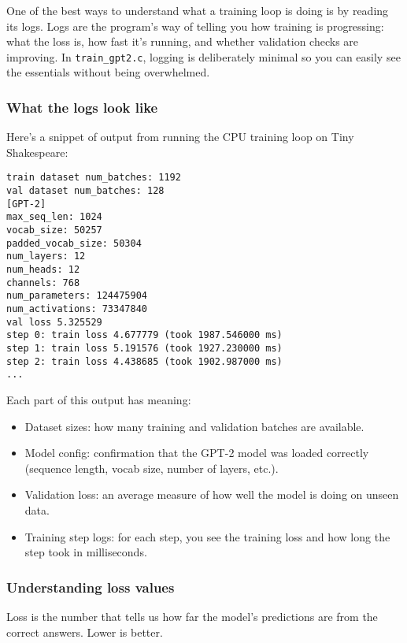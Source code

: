 \documentclass[
  letterpaper,
  DIV=11,
  numbers=noendperiod]{scrreprt}
\providecommand{\tightlist}{%
  \setlength{\itemsep}{0pt}\setlength{\parskip}{0pt}}
\begin{document}
One of the best ways to understand what a training loop is doing is by
reading its logs. Logs are the program's way of telling you how training
is progressing: what the loss is, how fast it's running, and whether
validation checks are improving. In \texttt{train\_gpt2.c}, logging is
deliberately minimal so you can easily see the essentials without being
overwhelmed.

\subsubsection{What the logs look like}\label{what-the-logs-look-like}

Here's a snippet of output from running the CPU training loop on Tiny
Shakespeare:

\begin{verbatim}
train dataset num_batches: 1192
val dataset num_batches: 128
[GPT-2]
max_seq_len: 1024
vocab_size: 50257
padded_vocab_size: 50304
num_layers: 12
num_heads: 12
channels: 768
num_parameters: 124475904
num_activations: 73347840
val loss 5.325529
step 0: train loss 4.677779 (took 1987.546000 ms)
step 1: train loss 5.191576 (took 1927.230000 ms)
step 2: train loss 4.438685 (took 1902.987000 ms)
...
\end{verbatim}

Each part of this output has meaning:

\begin{itemize}
\tightlist
\item
  Dataset sizes: how many training and validation batches are available.
\item
  Model config: confirmation that the GPT-2 model was loaded correctly
  (sequence length, vocab size, number of layers, etc.).
\item
  Validation loss: an average measure of how well the model is doing on
  unseen data.
\item
  Training step logs: for each step, you see the training loss and how
  long the step took in milliseconds.
\end{itemize}

\subsubsection{Understanding loss
values}\label{understanding-loss-values}

Loss is the number that tells us how far the model's predictions are
from the correct answers. Lower is better.
\end{document}
